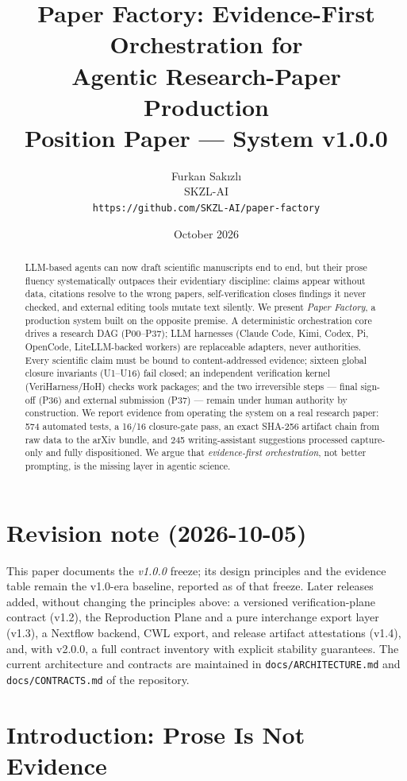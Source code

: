 \documentclass[10pt,twocolumn]{article}
\title{\textbf{Paper Factory: Evidence-First Orchestration for\\[2pt] Agentic Research-Paper Production}\\[6pt]
\large Position Paper --- System v1.0.0}
\author{Furkan Sak{\i}zl{\i}\\
SKZL-AI\\
\texttt{https://github.com/SKZL-AI/paper-factory}}
\date{October 2026}
\begin{document}
\maketitle
\thispagestyle{fancy}

\begin{abstract}
\noindent
LLM-based agents can now draft scientific manuscripts end to end, but their
prose fluency systematically outpaces their evidentiary discipline: claims
appear without data, citations resolve to the wrong papers, self-verification
closes findings it never checked, and external editing tools mutate text
silently. We present \emph{Paper Factory}, a production system built on the
opposite premise. A deterministic orchestration core drives a research DAG
(P00--P37); LLM harnesses (Claude Code, Kimi, Codex, Pi, OpenCode,
LiteLLM-backed workers) are replaceable adapters, never authorities. Every
scientific claim must be bound to content-addressed evidence; sixteen global
closure invariants (U1--U16) fail closed; an independent verification kernel
(VeriHarness/HoH) checks work packages; and the two irreversible steps ---
final sign-off (P36) and external submission (P37) --- remain under human
authority by construction. We report evidence from operating the system on a
real research paper: 574 automated tests, a 16/16 closure-gate pass, an exact
SHA-256 artifact chain from raw data to the arXiv bundle, and 245
writing-assistant suggestions processed capture-only and fully dispositioned.
We argue that \emph{evidence-first orchestration}, not better prompting, is
the missing layer in agentic science.
\end{abstract}

\section*{Revision note (2026-10-05)}
This paper documents the \emph{v1.0.0} freeze; its design principles and
the evidence table remain the v1.0-era baseline, reported as of that
freeze. Later releases added, without changing the principles above: a
versioned verification-plane contract (v1.2), the Reproduction Plane and
a pure interchange export layer (v1.3), a Nextflow backend, CWL export,
and release artifact attestations (v1.4), and, with v2.0.0, a full
contract inventory with explicit stability guarantees. The current
architecture and contracts are maintained in
\texttt{docs/ARCHITECTURE.md} and \texttt{docs/CONTRACTS.md} of the
repository.

\section{Introduction: Prose Is Not Evidence}
\end{document}
